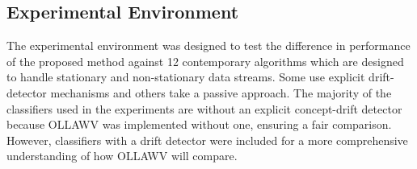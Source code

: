 \documentclass[reqno]{vcuthesis}
\numberwithin{equation}{chapter}
\begin{document}
\subsection{Experimental Environment}
\begin{table}[t!]
\caption{Data Stream Algorithms Used in Experimental Study} \centering \small
\label{tab:dsalgs}
\end{table}
The experimental environment was designed to test the difference in performance of the proposed method against 12 contemporary algorithms which are designed to handle stationary and non-stationary data streams. Some use explicit drift-detector mechanisms and others take a passive approach. The majority of the classifiers used in the experiments are without an explicit concept-drift detector because OLLAWV was implemented without one, ensuring a fair comparison. However, classifiers with a drift detector were included for a more comprehensive understanding of how OLLAWV will compare. 
\end{document}
